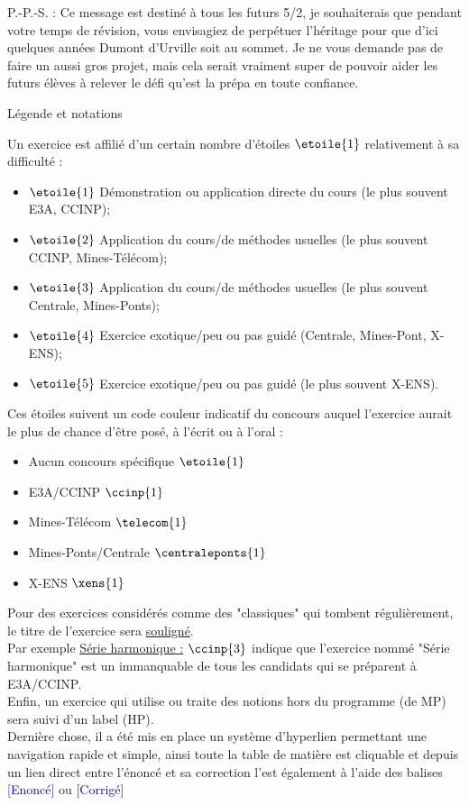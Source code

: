 \documentclass[8pt]{book}
\begin{document}
P.-P.-S. : Ce message est destiné à tous les futurs 5/2, je souhaiterais que pendant votre temps de révision, vous envisagiez de perpétuer l’héritage pour que d’ici quelques années Dumont d’Urville soit au sommet. Je ne vous demande pas de faire un aussi gros projet, mais cela serait vraiment super de pouvoir aider les futurs élèves à relever le défi qu’est la prépa en toute confiance. 
	\newpage
	\begin{center}\large{Légende et notations}\end{center}
	Un exercice est affilié d'un certain nombre d'étoiles $\etoile{1}$ relativement à sa difficulté :\\
	\begin{itemize}
		\item $\etoile{1}$ Démonstration ou application directe du cours (le plus souvent E3A, CCINP);
		\item $\etoile{2}$ Application du cours/de méthodes usuelles (le plus souvent CCINP, Mines-Télécom);
		\item $\etoile{3}$ Application du cours/de méthodes usuelles (le plus souvent Centrale, Mines-Ponts);
		\item $\etoile{4}$ Exercice exotique/peu ou pas guidé (Centrale, Mines-Pont, X-ENS);
		\item $\etoile{5}$ Exercice exotique/peu ou pas guidé (le plus souvent X-ENS).
	\end{itemize}
	Ces étoiles suivent un code couleur indicatif du concours auquel l'exercice aurait le plus de chance d'être posé, à l'écrit ou à l'oral :
	\begin{itemize}
		\item Aucun concours spécifique $\etoile{1}$
		\item E3A/CCINP $\ccinp{1}$
		\item Mines-Télécom $\telecom{1}$
		\item Mines-Ponts/Centrale $\centraleponts{1}$
		\item X-ENS $\xens{1}$
	\end{itemize}
	Pour des exercices considérés comme des "classiques" qui tombent régulièrement, le titre de l'exercice sera \underline{souligné}.\\
	Par exemple \underline{Série harmonique :} $\ccinp{3}$ indique que l'exercice nommé "Série harmonique" est un immanquable de tous les candidats qui se préparent à E3A/CCINP.\\
	Enfin, un exercice qui utilise ou traite des notions hors du programme (de MP) sera suivi d'un label (HP).\\
	Dernière chose, il a été mis en place un système d'hyperlien permettant une navigation rapide et simple, ainsi toute la table de matière est cliquable et depuis un lien direct entre l'énoncé et sa correction l'est également à l'aide des balises \textcolor{blue}{[Enoncé]} ou \textcolor{blue}{[Corrigé]}
	\setcounter{tocdepth}{1}
	\tableofcontents
	
\end{document}
